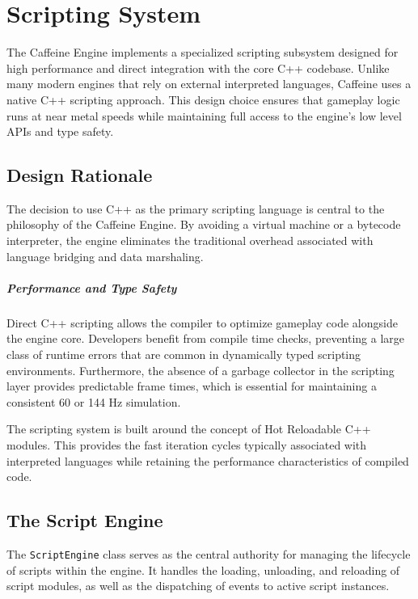 \chapter{Scripting System}

The Caffeine Engine implements a specialized scripting subsystem designed for high performance and direct integration with the core C++ codebase. Unlike many modern engines that rely on external interpreted languages, Caffeine uses a native C++ scripting approach. This design choice ensures that gameplay logic runs at near metal speeds while maintaining full access to the engine's low level APIs and type safety.

\section{Design Rationale}

The decision to use C++ as the primary scripting language is central to the philosophy of the Caffeine Engine. By avoiding a virtual machine or a bytecode interpreter, the engine eliminates the traditional overhead associated with language bridging and data marshaling.


\paragraph{Performance and Type Safety}

Direct C++ scripting allows the compiler to optimize gameplay code alongside the engine core. Developers benefit from compile time checks, preventing a large class of runtime errors that are common in dynamically typed scripting environments. Furthermore, the absence of a garbage collector in the scripting layer provides predictable frame times, which is essential for maintaining a consistent 60 or 144 Hz simulation.



The scripting system is built around the concept of Hot Reloadable C++ modules. This provides the fast iteration cycles typically associated with interpreted languages while retaining the performance characteristics of compiled code.

\section{The Script Engine}

The \texttt{ScriptEngine} class serves as the central authority for managing the lifecycle of scripts within the engine. It handles the loading, unloading, and reloading of script modules, as well as the dispatching of events to active script instances.

